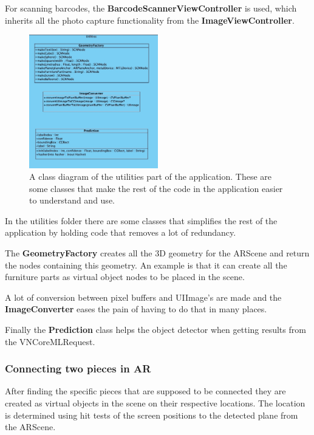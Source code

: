 For scanning barcodes, the \textbf{BarcodeScannerViewController} is used, which inherits all the photo capture functionality from the \textbf{ImageViewController}.\\

\begin{figure}[!hbtp]
\begin{center}
\includegraphics[width = 0.5\textwidth]{./Images/UtilitiesClassDiagram.jpg}
\caption{A class diagram of the utilities part of the application. These are some classes that make the rest of the code in the application easier to understand and use.}
\label{fig:classdiagramassembler}
\end{center}
\end{figure}

In the utilities folder there are some classes that simplifies the rest of the application
by holding code that removes a lot of redundancy.

The \textbf{GeometryFactory} creates all the 3D geometry for the ARScene and return the nodes 
containing this geometry. An example is that it can create all the furniture parts as virtual object 
nodes to be placed in the scene.

A lot of conversion between pixel buffers and UIImage's are made and the \textbf{ImageConverter }
eases the pain of having to do that in many places.

Finally the \textbf{Prediction} class helps the object detector when getting results
from the VNCoreMLRequest.

\subsubsection{Connecting two pieces in AR}
After finding the specific pieces that are supposed to be connected they are created as
virtual objects in the scene on their respective locations. The location is determined using
hit tests of the screen positions to the detected plane from the ARScene.

